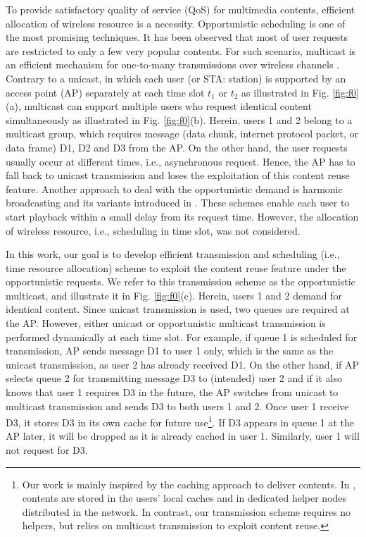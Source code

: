 \documentclass[conference]{IEEEtran}
\newcommand{\0}{\vect{0}}
\newcommand{\1}{\vect{1}}
\begin{document}
To provide satisfactory quality of service (QoS) for multimedia contents, efficient allocation of wireless resource is a necessity. Opportunistic scheduling is one of the most promising techniques. It has been observed that most of user requests are restricted to only a few very popular contents. For such scenario, multicast is an efficient mechanism for one-to-many transmissions over wireless channels \cite{Won09WC,Low10WC,Tsa11WC}. Contrary to a unicast, in which each user (or STA: station) is supported by an access point (AP) separately at each time slot $t_1$ or $t_2$ as illustrated in Fig. \ref{fig:f0}(a), multicast can support multiple users who request identical content simultaneously as illustrated in Fig. \ref{fig:f0}(b). Herein, users 1 and 2 belong to a multicast group, which requires message (data chunk, internet protocol packet, or data frame) D1, D2 and D3 from the AP. On the other hand, the user requests usually occur at different times, i.e., asynchronous  request. Hence, the AP has to fall back to unicast transmission and loses the exploitation of this content reuse feature. Another approach to deal with the opportunistic demand is harmonic broadcasting and its variants introduced in \cite{Juh97B,Cha07CSVT}. These schemes enable each user to start playback within a small delay from its request time. However, the allocation of wireless resource, i.e., scheduling in time slot, was not considered.





In this work, our goal is to develop efficient transmission and scheduling (i.e., time resource allocation) scheme to exploit the content reuse feature under the opportunistic requests. We refer to this transmission scheme as the opportunistic multicast, and illustrate it in Fig. \ref{fig:f0}(c). Herein, users 1 and 2 demand for identical content. Since unicast transmission is used, two queues are required at the AP. However, either unicast or opportunistic  multicast transmission is performed dynamically at each time slot. For example, if queue 1 is scheduled for transmission, AP sends message D1 to user 1 only, which is the same as the unicast transmission, as user 2 has already received D1. On the other hand, if AP selects queue 2 for transmitting message D3 to (intended) user 2 and if it also knows that user 1 requires D3 in the future, the AP switches from unicast to multicast transmission and sends D3 to both users 1 and 2. Once user 1 receive D3, it stores D3 in its own cache for future use\footnote{Our work is mainly inspired by the caching approach to deliver contents. In \cite{Gol13Arx,Ji13ISIT,Bet13ISIT}, contents are stored in the users' local caches and in dedicated helper nodes distributed in the network. In contrast, our transmission scheme requires no helpers, but relies on multicast transmission to exploit content reuse.}. If D3 appears in queue 1 at the AP later, it will be dropped as it is already cached in user 1. Similarly, user 1 will not request for D3.
\end{document}
